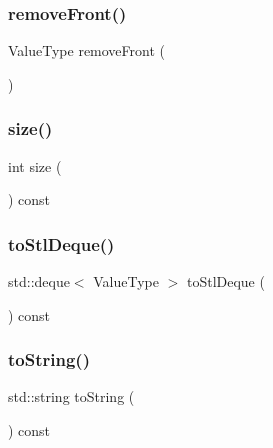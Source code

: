 \mbox{\label{classDeque_a02453aa96e93c38ca4c1d176307c8a63}} 
\subsubsection{\texorpdfstring{remove\+Front()}{removeFront()}}
{\footnotesize\ttfamily Value\+Type remove\+Front (\begin{DoxyParamCaption}{ }\end{DoxyParamCaption})}

\mbox{\label{classDeque_af9593d4a5ff4274efaf429cb4f9e57cc}} 
\subsubsection{\texorpdfstring{size()}{size()}}
{\footnotesize\ttfamily int size (\begin{DoxyParamCaption}{ }\end{DoxyParamCaption}) const}

\mbox{\label{classDeque_a577546d159bb5d7237f506789f2beafd}} 
\subsubsection{\texorpdfstring{to\+Stl\+Deque()}{toStlDeque()}}
{\footnotesize\ttfamily std\+::deque$<$ Value\+Type $>$ to\+Stl\+Deque (\begin{DoxyParamCaption}{ }\end{DoxyParamCaption}) const}

\mbox{\label{classDeque_a1fe5121d6528fdea3f243321b3fa3a49}} 
\subsubsection{\texorpdfstring{to\+String()}{toString()}}
{\footnotesize\ttfamily std\+::string to\+String (\begin{DoxyParamCaption}{ }\end{DoxyParamCaption}) const}

